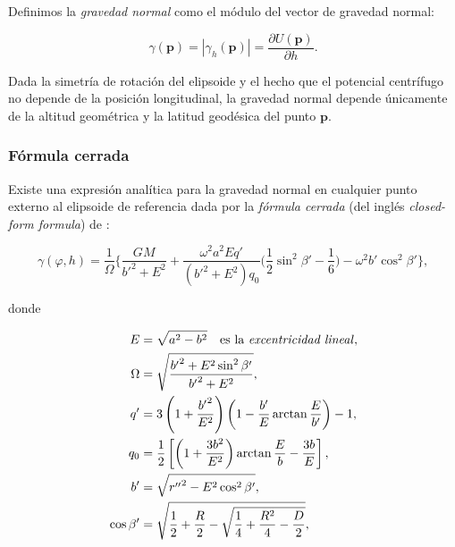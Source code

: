 Definimos la \emph{gravedad normal} como el módulo del vector de gravedad
normal:

\begin{equation}
    \gamma(\mathbf{p}) = | \gamma_h(\mathbf{p}) | =
        \frac{\partial U(\mathbf{p})}{\partial h}.
\end{equation}

Dada la simetría de rotación del elipsoide y el hecho que el potencial
centrífugo no depende de la posición longitudinal, la gravedad normal depende
únicamente de la altitud geométrica y la latitud geodésica del punto
$\mathbf{p}$.

\subsubsection{Fórmula cerrada}
\label{sec:normal-gravity-closed-form}

Existe una expresión analítica para la gravedad normal en cualquier punto
externo al elipsoide de referencia dada por la \emph{fórmula cerrada} (del
inglés \emph{closed-form formula}) de \citet{li2001a}:


\begin{equation}
    \gamma(\varphi, h) =
    \frac{1}{\Omega}
    \Bigg\{
        \frac{G M}{{b'}^2 + E^2}
        + \frac{\omega^2 a^2 E q'}{({b'}^2 + E^2) q_0}
        \Bigg(
            \frac{1}{2}
            \sin^2 \beta' - \frac{1}{6}
        \Bigg)
        - \omega^2 b' \cos^2 \beta'
    \Bigg\},
    \label{eq:normal-gravity-closed-form}
\end{equation}

\noindent donde

\begin{align}
    E &= \sqrt{a^2 - b^2}
        \quad \text{es la \emph{excentricidad lineal}}, \\
    \Omega &= \sqrt{\frac{{b'}^2 + E^2 \sin^2 \beta'}{{b'}^2 + E^2}}, \\
    q' &= 3
        \left(1 + \frac{{b'}^2}{E^2} \right)
        \left(1 - \frac{b'}{E} \arctan \frac{E}{b'} \right)
        - 1, \\
    q_0 &= \frac{1}{2}
        \left[
            \left(
                1 + \frac{3b^2}{E^2}
            \right)
            \arctan \frac{E}{b} - \frac{3b}{E}
        \right], \\
    b' &= \sqrt{{r''}^2 - E^2 \cos^2 \beta'}, \\
    \cos \beta' &= \sqrt{
        \frac{1}{2}
        + \frac{R}{2}
        - \sqrt{
            \frac{1}{4} + \frac{R^2}{4}  - \frac{D}{2}
        }
    },
\end{align}

